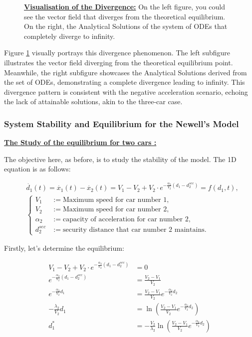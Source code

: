 \documentclass{article}
\begin{document}
\begin{figure}[H]
\begin{subfigure}{0.45\textwidth}
			\end{subfigure}
			\caption{\textbf{\underline{Visualisation of the Divergence:}} On the left figure, you could see the vector field that diverges from the theoretical equilibrium. On the right, the Analytical Solutions of the system of ODEs that completely diverge to infinity.}
			\label{fig:SE2}
		\end{figure}
		
		Figure \ref{fig:SE2} visually portrays this divergence phenomenon. The left subfigure illustrates the vector field diverging from the theoretical equilibrium point. Meanwhile, the right subfigure showcases the Analytical Solutions derived from the set of ODEs, demonstrating a complete divergence leading to infinity. This divergence pattern is consistent with the negative acceleration scenario, echoing the lack of attainable solutions, akin to the three-car case.
		
		
	\subsubsection{System Stability and Equilibrium for the Newell's Model}
	
	\textbf{\underline{The Study of the equilibrium for two cars : }} \newline\newline
	
	
	The objective here, as before, is to study the stability of the model. The 1D equation is as follows:
	
	\begin{align*}
		&\dot{d_1}(t) = \dot{x_1}(t) - \dot{x_2}(t) = V_1 - V_2 + V_2 \cdot e^{-\frac{\alpha_2}{V_2}(d_1 - d_{2}^{sec})} = f(d_1, t), \\
		&\left\{
		\begin{aligned}
			V_1 &:= \text{Maximum speed for car number 1}, \\
			V_2 &:= \text{Maximum speed for car number 2}, \\
			\alpha_2 &:= \text{capacity of acceleration for car number 2}, \\
			d_{2}^{sec} &:= \text{security distance that car number 2 maintains}.
		\end{aligned}
		\right.
	\end{align*}
	
	Firstly, let's determine the equilibrium:
	
	\begin{align*}
		V_1 - V_2 + V_2 \cdot e^{-\frac{\alpha_2}{V_2}(d_1 - d_{2}^{sec})} &= 0 \\
		e^{-\frac{\alpha_2}{V_2}(d_1 - d_{2}^{sec})} &= \frac{V_2-V_1}{V_2} \\
		e^{-\frac{\alpha_2}{V_2}d_1} &= \frac{V_2-V_1}{V_2}e^{-\frac{\alpha_2}{V_2}d_2} \\
		-\frac{\lambda_2}{V_2}d_1 &= \ln \left(\frac{V_2-V_1}{V_2}e^{-\frac{\alpha_2}{V_2}d_2} \right) \\
		d_1^* &= -\frac{V_2}{\lambda_2}\ln \left(\frac{V_2-V_1}{V_2}e^{-\frac{\alpha_2}{V_2}d_2} \right)
	\end{align*}
	
\end{document}
